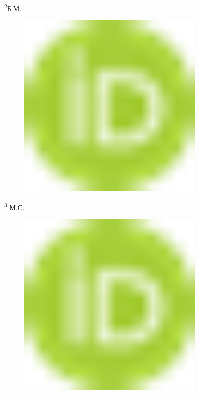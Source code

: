\textsuperscript{2}Б.М.
\begin{figure}[H]
	\centering
	\includegraphics[width=0.8\textwidth]{media/ict/image1}
	\caption*{}
\end{figure}

\textsuperscript{3} М.С.
\begin{figure}[H]
	\centering
	\includegraphics[width=0.8\textwidth]{media/ict/image1}
	\caption*{}
\end{figure}


